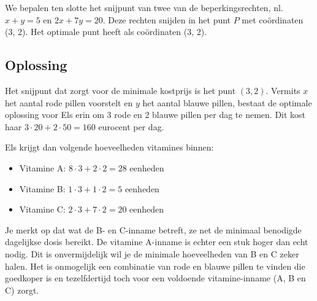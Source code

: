 We bepalen ten slotte
het snijpunt van twee van de beperkingsrechten, nl. $x + y
= 5$ en $2x + 7y = 20$. Deze rechten snijden in het punt $P$
met co\"{o}rdinaten (3, 2). Het optimale punt heeft als co\"{o}rdinaten (3, 2).


\subsection{Oplossing}
Het snijpunt dat zorgt voor de minimale kostprijs is het punt
$(3, 2)$. Vermits $x$ het aantal rode pillen voorstelt en $y$ het aantal
blauwe pillen, bestaat de optimale oplossing voor
Els erin om 3 rode en 2 blauwe pillen per dag te nemen. Dit kost
haar $3\cdot 20 + 2\cdot 50 = 160$ eurocent per dag.

Els krijgt dan volgende hoeveelheden vitamines binnen:
\begin{itemize}
    \item  Vitamine A: $8\cdot 3 + 2\cdot 2 = 28$ eenheden

    \item  Vitamine B: $1\cdot 3 + 1\cdot 2 = 5$ eenheden

    \item  Vitamine C: $2\cdot 3 + 7\cdot 2 = 20$ eenheden
\end{itemize}
Je merkt op dat wat de B- en C-inname betreft, ze net de minimaal
benodigde dagelijkse dosis bereikt. De vitamine A-inname is echter
een stuk hoger dan echt nodig. Dit is onvermijdelijk wil je de
minimale hoeveelheden van B en C zeker halen.
Het is onmogelijk een combinatie van rode en blauwe pillen te
vinden die goedkoper is en tezelfdertijd toch voor een voldoende
vitamine-inname (A, B en C) zorgt.

\newpage

